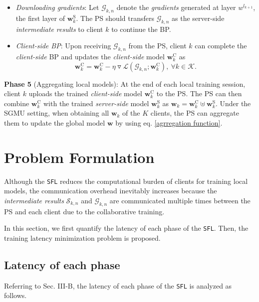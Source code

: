 \documentclass[10pt,journal,transmag]{IEEEtran}
\begin{document}
\begin{itemize}
\begin{itemize}
        \item[(5)] \textit{Downloading gradients}: Let $\mathcal{G}_{k,n}$ denote the \textit{gradients} generated at layer $w^{l_{k+1}}$, the first layer of $\textbf{w}^\text{S}_k$. The PS should transfers $\mathcal{G}_{k,n}$ as the server-side \textit{intermediate results} to client $k$ to continue the BP.
    
        \item[(6)] \textit{Client-side BP}: Upon receiving $\mathcal{G}_{k,n}$ from the PS, client $k$ can complete the \textit{client-side} BP and updates the \textit{client-side} model $\textbf{w}^\text{C}_k$ as 
        \begin{equation}
            \textbf{w}^\text{C}_k = \textbf{w}^\text{C}_k - \eta \triangledown \mathcal{L}(\mathcal{G}_{k,n}; \textbf{w}^\text{C}_k),\  \forall k \in \mathcal{K}.
        \end{equation}
    \end{itemize}
\end{itemize}


\textbf{Phase 5} (Aggregating local models): At the end of each local training session, client $k$ uploads the trained \textit{client-side} model $\textbf{w}^\text{C}_{k}$ to the PS. The PS can then combine $\textbf{w}^\text{C}_{k}$ with the trained \textit{server-side} model $\textbf{w}^\text{S}_{k}$ as $\textbf{w}_k = \textbf{w}^\text{C}_k \uplus \textbf{w}^\text{S}_k$.
Under the SGMU setting, when obtaining all $\textbf{w}_k$ of the $K$ clients, the PS can aggregate them to update the global model $\textbf{w}$ by using eq. \eqref{agrregation function}.


\section{Problem Formulation}
Although the \texttt{SFL} reduces the computational burden of clients for training local models, the communication overhead inevitably increases because the \textit{intermediate results} $\mathcal{S}_{k,n}$ and $\mathcal{G}_{k,n}$ are communicated multiple times between the PS and each client due to the collaborative training.

In this section, we first quantify the latency of each phase of the \texttt{SFL}. Then, the training latency minimization problem is proposed.

\subsection{Latency of each phase}
Referring to Sec. III-B, the latency of each phase of the \texttt{SFL} is analyzed as follows.
\end{document}
